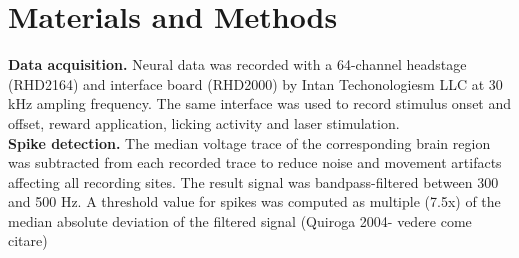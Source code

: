 \appendix
\chapter{Materials and Methods}
\textbf{Data acquisition.} Neural data was recorded with a 64-channel headstage (RHD2164) and interface board (RHD2000) by Intan Techonologiesm LLC at 30 kHz ampling frequency. The same interface was used to record stimulus onset and offset, reward application, licking activity and laser stimulation.\\
\textbf{Spike detection.} The median voltage trace of the corresponding brain region was subtracted from each recorded trace to reduce noise and movement artifacts affecting all recording sites. The result signal was bandpass-filtered between 300 and 500 Hz. A threshold value for spikes was computed as multiple (7.5x) of the median absolute deviation of the filtered signal ({\color{red}Quiroga 2004- vedere come citare})